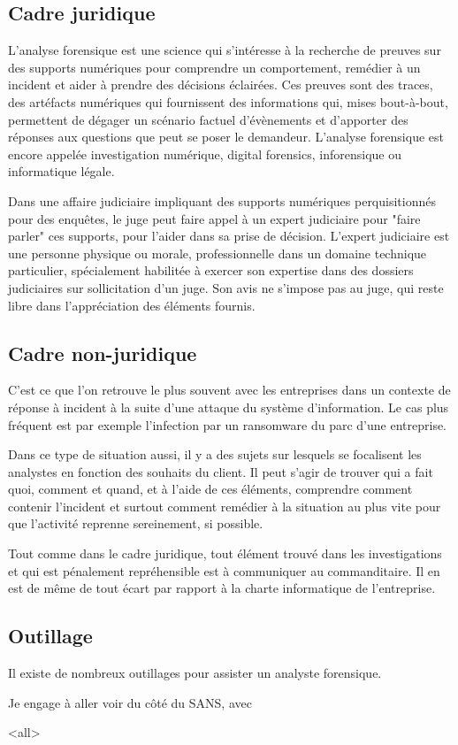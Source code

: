 
\subsection{Cadre juridique}

L'analyse forensique est une science qui s'intéresse à la recherche de preuves sur des supports numériques pour comprendre un comportement, remédier à un incident et aider à prendre des décisions éclairées. Ces preuves sont des traces, des artéfacts numériques qui fournissent des informations qui, mises bout-à-bout, permettent de dégager un scénario factuel d'évènements et d'apporter des réponses aux questions que peut se poser le demandeur. L'analyse forensique est encore appelée investigation numérique, digital forensics, inforensique ou informatique légale.


Dans une affaire judiciaire impliquant des supports numériques perquisitionnés pour des enquêtes, le juge peut faire appel à un expert judiciaire pour "faire parler" ces supports, pour l'aider dans sa prise de décision. L'expert judiciaire est une personne physique ou morale, professionnelle dans un domaine technique particulier, spécialement habilitée à exercer son expertise dans des dossiers judiciaires sur sollicitation d'un juge. Son avis ne s'impose pas au juge, qui reste libre dans l'appréciation des éléments fournis.


\subsection{Cadre non-juridique}

C'est ce que l'on retrouve le plus souvent avec les entreprises dans un contexte de réponse à incident à la suite d'une attaque du système d'information. Le cas plus fréquent est par exemple l'infection par un ransomware du parc d'une entreprise.

Dans ce type de situation aussi, il y a des sujets sur lesquels se focalisent les analystes en fonction des souhaits du client. Il peut s'agir de trouver qui a fait quoi, comment et quand, et à l'aide de ces éléments, comprendre comment contenir l'incident et surtout comment remédier à la situation au plus vite pour que l'activité reprenne sereinement, si possible.

Tout comme dans le cadre juridique, tout élément trouvé dans les investigations et qui est pénalement repréhensible est à communiquer au commanditaire. Il en est de même de tout écart par rapport à la charte informatique de l'entreprise.

\subsection{Outillage}

Il existe de nombreux outillages pour assister un analyste forensique.

Je engage à aller voir du côté du SANS, avec 

\mode<all>{}

